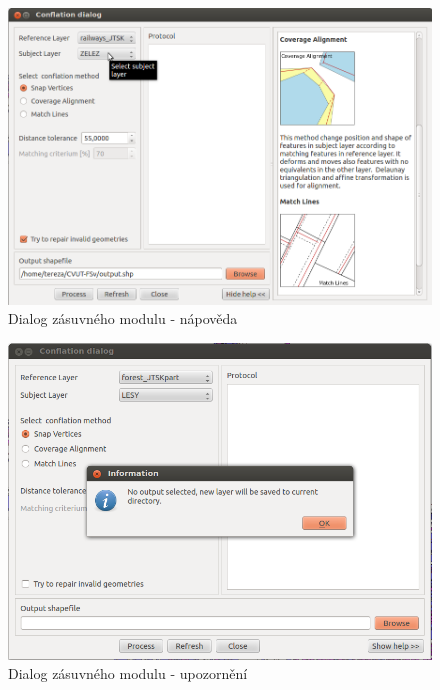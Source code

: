   \begin{figure}[H]
    \centering
      \includegraphics[width=360pt]{./pictures/dialog2.png}
      \caption{Dialog zásuvného modulu - nápověda}
      \label{fig:d2}
  \end{figure} 

  \begin{figure}[H]
    \centering
      \includegraphics[width=360pt]{./pictures/dialog3.png}
      \caption{Dialog zásuvného modulu - upozornění}
      \label{fig:d3}
  \end{figure} 

